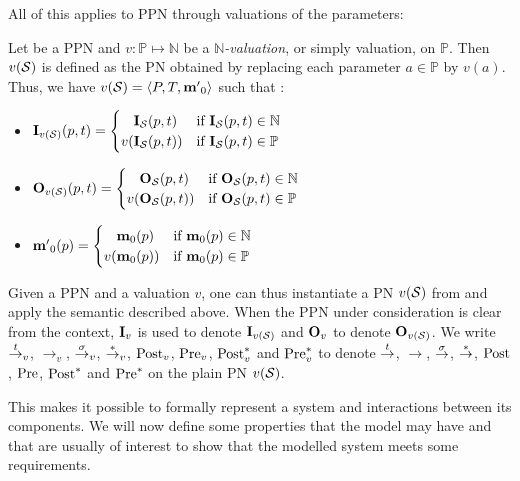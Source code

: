 All of this applies to \ac{PPN} through valuations of the parameters:
\begin{defi}
  Let \SPTPm be a \ac{PPN} and $v : \mathbb{P} \mapsto \mathbb{N}$ be a \emph{$\mathbb{N}$-valuation}, or simply valuation, on $\mathbb{P}$.
  Then $v(\mathcal{S})$ is defined as the \ac{PN} obtained by replacing each parameter $a \in \mathbb{P}$ by $v(a)$.
  Thus, we have $v(\mathcal{S}) = \langle P, T, \mathbf{m'}_0\rangle$ such that :
  \begin{itemize}
    \item $\mathbf{I}_{v(\mathcal{S})}(p, t) =
      \begin{cases}
        \phantom{v(}\mathbf{I}_\mathcal{S}(p, t) & \text{if } \mathbf{I}_\mathcal{S}(p, t) \in \mathbb{N} \\
                 v(\mathbf{I}_\mathcal{S}(p, t)) & \text{if } \mathbf{I}_\mathcal{S}(p, t) \in \mathbb{P}
      \end{cases}$
    \item $\mathbf{O}_{v(\mathcal{S})}(p, t) =
      \begin{cases}
        \phantom{v(}\mathbf{O}_\mathcal{S}(p, t) & \text{if } \mathbf{O}_\mathcal{S}(p, t) \in \mathbb{N} \\
                 v(\mathbf{O}_\mathcal{S}(p, t)) & \text{if } \mathbf{O}_\mathcal{S}(p, t) \in \mathbb{P}
      \end{cases}$
    \item $\mathbf{m'}_0(p) =
      \begin{cases}
        \phantom{v(}\mathbf{m}_0(p) & \text{if } \mathbf{m}_0(p) \in \mathbb{N} \\
                 v(\mathbf{m}_0(p)) & \text{if } \mathbf{m}_0(p) \in \mathbb{P}
      \end{cases}$
  \end{itemize}
\end{defi}

Given \PPN a \ac{PPN} and a valuation $v$, one can thus instantiate a \ac{PN} $v(\mathcal{S})$ from \PPN and apply the semantic described above.  When the \ac{PPN} under consideration is clear from the context, $\mathbf{I}_v$ is used to denote $\mathbf{I}_{v(\mathcal{S})}$ and $\mathbf{O}_v$ to denote $\mathbf{O}_{v(\mathcal{S})}$. We write $\stackrel{t}{\to}_v$, $\rightarrow_v$, $\stackrel{\sigma}{\to}_v$, $\stackrel{*}{\to}_v$, $\operatorname{Post}_v$, $\operatorname{Pre}_v$, $\operatorname{Post}^*_v$ and $\operatorname{Pre}^*_v$ to denote $\stackrel{t}{\to}$, $\rightarrow$, $\stackrel{\sigma}{\to}$, $\stackrel{*}{\to}$, $\operatorname{Post}$, $\operatorname{Pre}$, $\operatorname{Post}^*$ and $\operatorname{Pre}^*$ on the plain \ac{PN} $v(\mathcal{S})$.

This makes it possible to formally represent a system and interactions between its components. We will now define some properties that the model may have and that are usually of interest to show that the modelled system meets some requirements.

